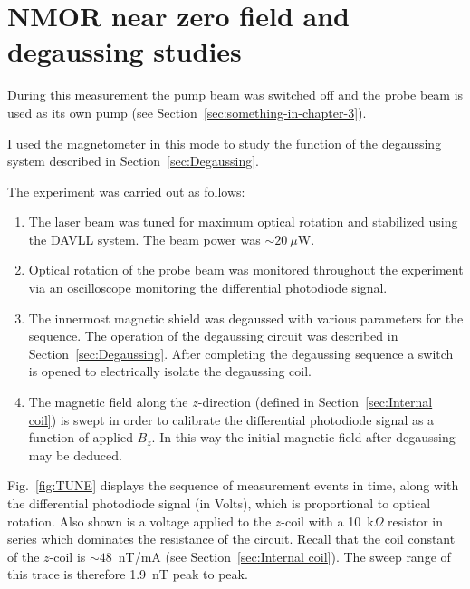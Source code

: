 \section{NMOR near zero field and degaussing studies}

During this measurement the pump beam was switched off and the probe
beam is used as its own pump (see
Section~\ref{sec:something-in-chapter-3}).

I used the magnetometer in this mode to study the function of the
degaussing system described in
Section~\ref{sec:Degaussing}.

The experiment was carried out as follows:
\begin{enumerate}
\item The laser beam was tuned for maximum optical rotation and
  stabilized using the DAVLL system.  The beam power was $\sim
  20~\mu$W.
\item Optical rotation of the probe beam was monitored throughout the
  experiment via an oscilloscope monitoring the differential
  photodiode signal.
\item The innermost magnetic shield was degaussed with various
  parameters for the sequence.  The operation of the degaussing
  circuit was described in Section~\ref{sec:Degaussing}.  After
  completing the degaussing sequence a switch is opened to
  electrically isolate the degaussing coil.
\item The magnetic field along the $z$-direction (defined in
  Section~\ref{sec:Internal coil}) is swept in order to calibrate the
  differential photodiode signal as a function of applied $B_z$.  In
  this way the initial magnetic field after degaussing may be deduced.
\end{enumerate}
Fig.~\ref{fig:TUNE} displays the sequence of measurement events in
time, along with the differential photodiode signal (in Volts), which
is proportional to optical rotation.  Also shown is a voltage applied
to the $z$-coil with a 10~k$\Omega$ resistor in series which dominates
the resistance of the circuit.  Recall that the coil constant of the
$z$-coil is $\sim 48$~nT/mA (see Section~\ref{sec:Internal coil}).
The sweep range of this trace is therefore
1.9~nT peak to peak.


